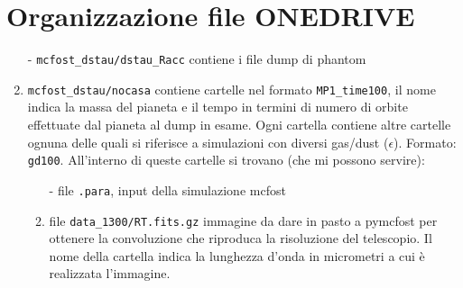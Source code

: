 \documentclass[DIN, pagenumber=false, fontsize=11pt, parskip=half]{scrartcl}
\begin{document}
\section{Organizzazione file ONEDRIVE}

\begin{enumerate}
 \item[-] \lstinline{mcfost_dstau/dstau_Racc} contiene i file dump di phantom
 \item[-] \lstinline{mcfost_dstau/nocasa} contiene cartelle nel formato \lstinline{MP1_time100}, il nome indica la massa del pianeta e il tempo in termini di numero di orbite effettuate dal pianeta al dump in esame. Ogni cartella contiene
 altre cartelle ognuna delle quali si riferisce a simulazioni con diversi gas/dust ($\epsilon$). Formato: \lstinline{gd100}. All'interno di queste cartelle si trovano (che mi possono servire):
 \begin{enumerate}
 \item[-] file \lstinline{.para}, input della simulazione mcfost 
 \item[-] file \lstinline{data_1300/RT.fits.gz} immagine da dare in pasto a pymcfost per ottenere la convoluzione che riproduca la risoluzione del telescopio. Il nome della cartella indica la lunghezza d'onda in micrometri a cui è realizzata l'immagine.
\end{enumerate}
\end{enumerate}
\end{document}

